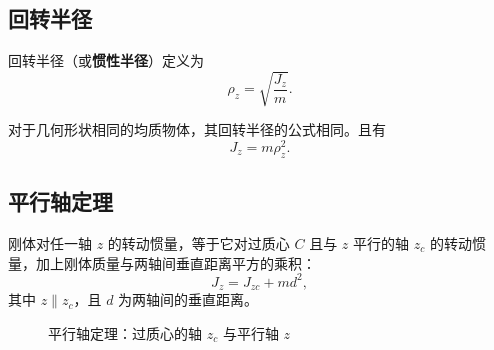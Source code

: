 \subsection{回转半径}

\begin{definition}[回转半径]
回转半径（或\textbf{惯性半径}）定义为
\begin{equation}\label{eq:12-rho-def}
  \rho_z=\sqrt{\frac{J_z}{m}}.
\end{equation}
\end{definition}

对于几何形状相同的均质物体，其回转半径的公式相同。且有
\begin{equation}\label{eq:12-jz-rho}
  J_z=m\rho_z^2.
\end{equation}

\subsection{平行轴定理}

\begin{theorem}[平行轴定理]
刚体对任一轴 $z$ 的转动惯量，等于它对过质心 $C$ 且与 $z$ 平行的轴 $z_c$ 的转动惯量，加上刚体质量与两轴间垂直距离平方的乘积：
\begin{equation}\label{eq:12-parallel-statement}
  J_z=J_{zc}+md^2,
\end{equation}
其中 $z\parallel z_c$，且 $d$ 为两轴间的垂直距离。
\end{theorem}

\begin{figure}[htbp]
\centering
{}
\caption{平行轴定理：过质心的轴 $z_c$ 与平行轴 $z$}\label{fig:12-parallel}
\end{figure}

